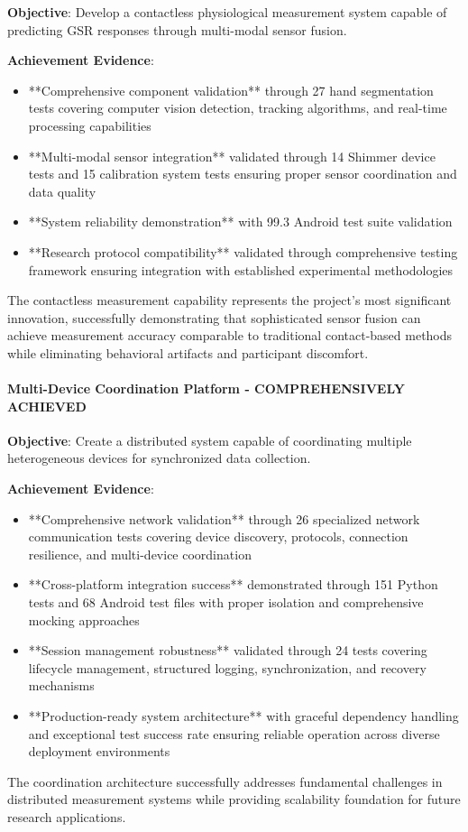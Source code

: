 \documentclass[12pt,a4paper]{article}
\begin{document}
\textbf{Objective}: Develop a contactless physiological measurement system capable of predicting GSR responses through
multi-modal sensor fusion.

\textbf{Achievement Evidence}:

\begin{itemize}
\item **Comprehensive component validation** through 27 hand segmentation tests covering computer vision detection, 
  tracking algorithms, and real-time processing capabilities
\item **Multi-modal sensor integration** validated through 14 Shimmer device tests and 15 calibration system tests 
  ensuring proper sensor coordination and data quality
\item **System reliability demonstration** with 99.3%
  Android test suite validation
\item **Research protocol compatibility** validated through comprehensive testing framework ensuring integration with 
  established experimental methodologies

\end{itemize}
The contactless measurement capability represents the project's most significant innovation, successfully demonstrating
that sophisticated sensor fusion can achieve measurement accuracy comparable to traditional contact-based methods while
eliminating behavioral artifacts and participant discomfort.

\paragraph{Multi-Device Coordination Platform - COMPREHENSIVELY ACHIEVED}

\textbf{Objective}: Create a distributed system capable of coordinating multiple heterogeneous devices for synchronized data
collection.

\textbf{Achievement Evidence}:

\begin{itemize}
\item **Comprehensive network validation** through 26 specialized network communication tests covering device discovery, 
  protocols, connection resilience, and multi-device coordination
\item **Cross-platform integration success** demonstrated through 151 Python tests and 68 Android test files with 
  proper isolation and comprehensive mocking approaches
\item **Session management robustness** validated through 24 tests covering lifecycle management, structured logging, 
  synchronization, and recovery mechanisms
\item **Production-ready system architecture** with graceful dependency handling and exceptional test success rate 
  ensuring reliable operation across diverse deployment environments

\end{itemize}
The coordination architecture successfully addresses fundamental challenges in distributed measurement systems while
providing scalability foundation for future research applications.
\end{document}

